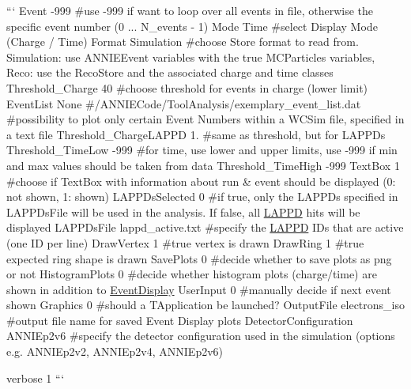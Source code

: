 ``` Event -\/999 \#use -\/999 if want to loop over all events in file, otherwise the specific event number (0 ... N\-\_\-events -\/ 1) Mode Time \#select Display Mode (Charge / Time) Format Simulation \#choose Store format to read from. Simulation\-: use A\-N\-N\-I\-E\-Event variables with the true M\-C\-Particles variables, Reco\-: use the Reco\-Store and the associated charge and time classes Threshold\-\_\-\-Charge 40 \#choose threshold for events in charge (lower limit) Event\-List None \#/\-A\-N\-N\-I\-E\-Code/\-Tool\-Analysis/exemplary\-\_\-event\-\_\-list.dat \#possibility to plot only certain Event Numbers within a W\-C\-Sim file, specified in a text file Threshold\-\_\-\-Charge\-L\-A\-P\-P\-D 1. \#same as threshold, but for L\-A\-P\-P\-Ds Threshold\-\_\-\-Time\-Low -\/999 \#for time, use lower and upper limits, use -\/999 if min and max values should be taken from data Threshold\-\_\-\-Time\-High -\/999 Text\-Box 1 \#choose if Text\-Box with information about run \& event should be displayed (0\-: not shown, 1\-: shown) L\-A\-P\-P\-Ds\-Selected 0 \#if true, only the L\-A\-P\-P\-Ds specified in L\-A\-P\-P\-Ds\-File will be used in the analysis. If false, all \hyperlink{classLAPPD}{L\-A\-P\-P\-D} hits will be displayed L\-A\-P\-P\-Ds\-File lappd\-\_\-active.\-txt \#specify the \hyperlink{classLAPPD}{L\-A\-P\-P\-D} I\-Ds that are active (one I\-D per line) Draw\-Vertex 1 \#true vertex is drawn Draw\-Ring 1 \#true expected ring shape is drawn Save\-Plots 0 \#decide whether to save plots as png or not Histogram\-Plots 0 \#decide whether histogram plots (charge/time) are shown in addition to \hyperlink{classEventDisplay}{Event\-Display} User\-Input 0 \#manually decide if next event shown Graphics 0 \#should a T\-Application be launched? Output\-File electrons\-\_\-iso \#output file name for saved Event Display plots Detector\-Configuration A\-N\-N\-I\-Ep2v6 \#specify the detector configuration used in the simulation (options e.\-g. A\-N\-N\-I\-Ep2v2, A\-N\-N\-I\-Ep2v4, A\-N\-N\-I\-Ep2v6)

verbose 1 ``` 